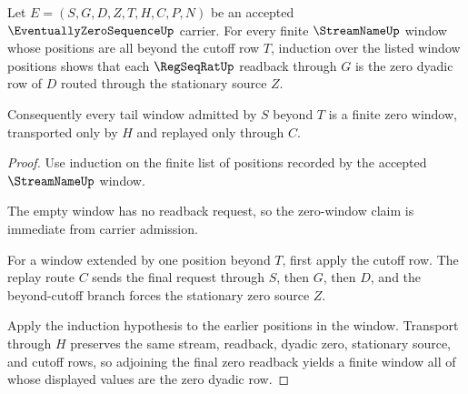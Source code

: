 \begin{theorem}
\label{thm:eventually-zero-sequence-window-cutoff-induction}
Let $E=(S,G,D,Z,T,H,C,P,N)$ be an accepted $\EventuallyZeroSequenceUp$ carrier. For every finite $\StreamNameUp$ window whose positions are all beyond the cutoff row $T$, induction over the listed window positions shows that each $\RegSeqRatUp$ readback through $G$ is the zero dyadic row of $D$ routed through the stationary source $Z$.

Consequently every tail window admitted by $S$ beyond $T$ is a finite zero window, transported only by $H$ and replayed only through $C$.
\end{theorem}
\begin{proof}
Use induction on the finite list of positions recorded by the accepted $\StreamNameUp$ window.

The empty window has no readback request, so the zero-window claim is immediate from carrier admission.

For a window extended by one position beyond $T$, first apply the cutoff row. The replay route $C$ sends the final request through $S$, then $G$, then $D$, and the beyond-cutoff branch forces the stationary zero source $Z$.

Apply the induction hypothesis to the earlier positions in the window. Transport through $H$ preserves the same stream, readback, dyadic zero, stationary source, and cutoff rows, so adjoining the final zero readback yields a finite window all of whose displayed values are the zero dyadic row.
\end{proof}


